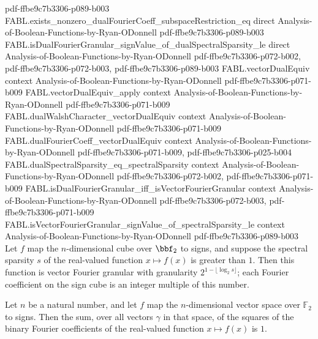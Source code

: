 \begin{theorem}
  {pdf-ffbe9c7b3306-p089-b003}
\proofstep
  {FABL.exists_nonzero_dualFourierCoeff_subspaceRestriction_eq}
  {direct}
  {Analysis-of-Boolean-Functions-by-Ryan-ODonnell}
  {pdf-ffbe9c7b3306-p089-b003}
\proofstep
  {FABL.isDualFourierGranular_signValue_of_dualSpectralSparsity_le}
  {direct}
  {Analysis-of-Boolean-Functions-by-Ryan-ODonnell}
  {pdf-ffbe9c7b3306-p072-b002,
    pdf-ffbe9c7b3306-p072-b003,
    pdf-ffbe9c7b3306-p089-b003}
\proofstep
  {FABL.vectorDualEquiv}
  {context}
  {Analysis-of-Boolean-Functions-by-Ryan-ODonnell}
  {pdf-ffbe9c7b3306-p071-b009}
\proofstep
  {FABL.vectorDualEquiv_apply}
  {context}
  {Analysis-of-Boolean-Functions-by-Ryan-ODonnell}
  {pdf-ffbe9c7b3306-p071-b009}
\proofstep
  {FABL.dualWalshCharacter_vectorDualEquiv}
  {context}
  {Analysis-of-Boolean-Functions-by-Ryan-ODonnell}
  {pdf-ffbe9c7b3306-p071-b009}
\proofstep
  {FABL.dualFourierCoeff_vectorDualEquiv}
  {context}
  {Analysis-of-Boolean-Functions-by-Ryan-ODonnell}
  {pdf-ffbe9c7b3306-p071-b009,
    pdf-ffbe9c7b3306-p025-b004}
\proofstep
  {FABL.dualSpectralSparsity_eq_spectralSparsity}
  {context}
  {Analysis-of-Boolean-Functions-by-Ryan-ODonnell}
  {pdf-ffbe9c7b3306-p072-b002,
    pdf-ffbe9c7b3306-p071-b009}
\proofstep
  {FABL.isDualFourierGranular_iff_isVectorFourierGranular}
  {context}
  {Analysis-of-Boolean-Functions-by-Ryan-ODonnell}
  {pdf-ffbe9c7b3306-p072-b003,
    pdf-ffbe9c7b3306-p071-b009}
\proofstep
  {FABL.isVectorFourierGranular_signValue_of_spectralSparsity_le}
  {context}
  {Analysis-of-Boolean-Functions-by-Ryan-ODonnell}
  {pdf-ffbe9c7b3306-p089-b003}
Let $f$ map the $n$-dimensional cube over $\bbf_2$ to signs, and suppose the spectral
sparsity $s$ of the real-valued function $x\mapsto f(x)$ is greater than $1$. Then this
function is vector Fourier granular with granularity $2^{1-\lfloor\log_2 s\rfloor}$;
each Fourier coefficient on the sign cube is an integer multiple of this number.
\end{theorem}

\begin{theorem}
\label{FABL.sum_sq_vectorFourierCoeff_signValue_eq_one}
\leanok
{}
Let $n$ be a natural number, and let $f$ map the $n$-dimensional vector space over
$\mathbb F_2$ to signs. Then the sum, over all vectors $\gamma$ in that space, of the
squares of the binary Fourier coefficients of the real-valued function $x\mapsto f(x)$
is $1$.
\end{theorem}

